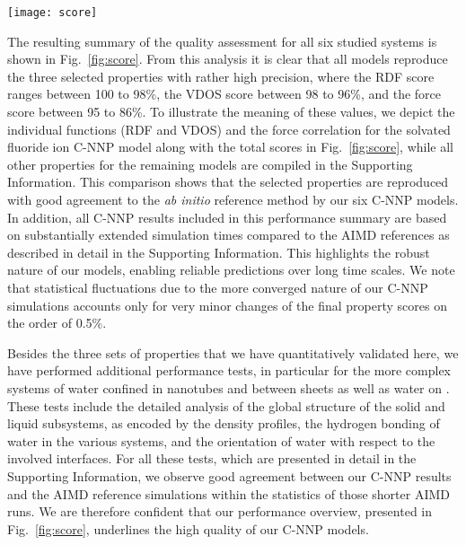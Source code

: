 \documentclass[aip,jcp,amsmath,amssymb,floatfix,reprint,citeautoscript,noeprint]{revtex4-1}
\begin{document}
\begin{bibunit}
\begin{figure*}
\centering
\texttt{[image: score]}
\caption{\label{fig:score}
Performance assessment of the committee
neural network potentials (C-NNP) for six different aqueous systems.
%
The bar plot on the left features the summary of the accuracy
for the radial distribution functions (RDF), the
vibrational density of states (VDOS) and the force
predictions (Force) in percent for each system.
%
The plots on the right depict the species resolved
functions (RDF, VDOS (in logarithmic scale)) and the force correlation of the
C-NNP model with respect to the reference method
for the solvated fluoride ion () C-NNP model,
which are condensed into the three scores for the fluoride/water C-NNP model, shown on the left.
%
Details of the suitable difference measure and reduction for the three properties can be found in the Supporting Information.
%
}
\end{figure*}

%
The resulting summary of the quality assessment for all six studied systems is
shown in Fig.~\ref{fig:score}.
%
From this analysis it is clear that all models
reproduce the three selected
properties with rather high precision, where the RDF score ranges between
100 to 98\%, the VDOS score between
98 to 96\%, and the force score between
95 to 86\%.
%
To illustrate the meaning of these values, we
depict the individual functions (RDF and VDOS)
and the force correlation for the solvated fluoride
ion C-NNP model along with the total scores
in Fig.~\ref{fig:score}, while all other properties
for the remaining models are compiled in the Supporting Information.
%
This comparison shows that the selected
properties are reproduced with good
agreement to the \textit{ab initio} reference method
by our six C-NNP models.
%
In addition, all C-NNP results included in this
performance summary are based on substantially extended 
simulation times compared to the AIMD references as described in detail
in the Supporting Information.
%
This highlights the robust nature of our models, enabling
reliable predictions over long time scales.
%
We note that statistical fluctuations due to the more converged
nature of our C-NNP simulations accounts only for very minor changes of
the final property scores on the order of 0.5\%.

%
Besides the three sets of properties that we have quantitatively validated here, we have performed additional performance tests, in particular for the more complex systems of water confined in nanotubes and between  sheets as well as water on .
%
These tests include the detailed analysis of the global structure of the solid and liquid subsystems, as encoded by the density profiles, the hydrogen bonding of water in the various systems, and the orientation of water with respect to the involved interfaces.
%
For all these tests, which are presented in detail in the Supporting Information, we observe good agreement between our C-NNP results and the AIMD reference simulations within the statistics of those shorter AIMD runs.
%
We are therefore confident that our performance overview, presented in Fig.~\ref{fig:score}, underlines the high quality of our C-NNP models.


\end{bibunit}
\end{document}
